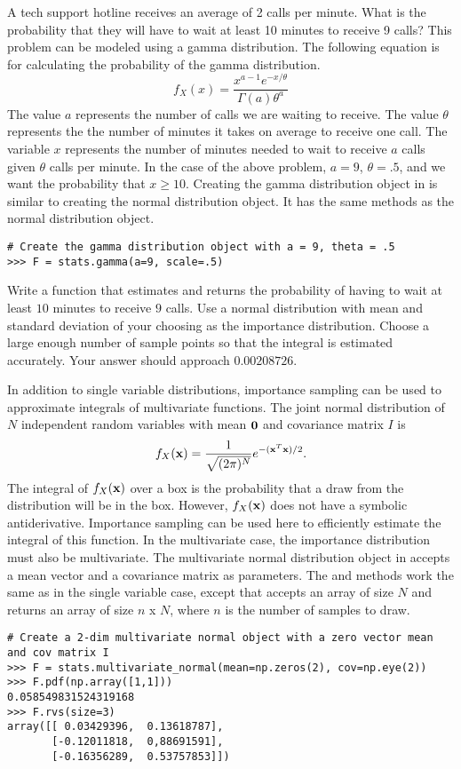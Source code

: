 \begin{problem} \label{prob:gamma}
A tech support hotline receives an average of 2 calls per minute.
What is the probability that they will have to wait at least 10 minutes to receive 9 calls?
This problem can be modeled using a gamma distribution.
The following equation is for calculating the probability of the gamma distribution.
$$f_X(x) = \frac{x^{a-1}e^{-x/\theta}}{\Gamma(a)\theta^a}$$
The value $a$ represents the number of calls we are waiting to receive.
The value $\theta$ represents the the number of minutes it takes on average to receive one call.
The variable $x$ represents the number of minutes needed to wait to receive $a$ calls given $\theta$ calls per minute.
In the case of the above problem, $a = 9$, $\theta = .5$, and we want the probability that $x \geq 10$.
Creating the gamma distribution object in  is similar to creating the normal distribution object.
It has the same methods as the normal distribution object.

\begin{lstlisting}
# Create the gamma distribution object with a = 9, theta = .5
>>> F = stats.gamma(a=9, scale=.5)
\end{lstlisting}

Write a function that estimates and returns the probability of having to wait at least $10$ minutes to receive $9$ calls.
Use a normal distribution with mean and standard deviation of your choosing as the importance distribution.
Choose a large enough number of sample points so that the integral is estimated accurately.
Your answer should approach $0.00208726$.
\end{problem}

In addition to single variable distributions, importance sampling can be used to approximate integrals of multivariate functions.
The joint normal distribution of $N$ independent random variables with mean $\mathbf{0}$ and covariance matrix $I$ is
\[
f_X(\mathbf{x}) = \frac{1}{\sqrt{(2 \pi)^N}} e^{-(\mathbf{x}^T\mathbf{x})/2}.
\]
The integral of $f_X(\mathbf{x})$ over a box is the probability that a draw from the distribution will be in the box.
However, $f_X(\mathbf{x})$ does not have a symbolic antiderivative.
Importance sampling can be used here to efficiently estimate the integral of this function.
In the multivariate case, the importance distribution must also be multivariate.
The multivariate normal distribution object in  accepts a mean vector and a covariance matrix as parameters.
The  and  methods work the same as in the single variable case, except that  accepts an array of size $N$ and  returns an array of size $n$ x $N$, where $n$ is the number of samples to draw.
\begin{lstlisting}
# Create a 2-dim multivariate normal object with a zero vector mean and cov matrix I
>>> F = stats.multivariate_normal(mean=np.zeros(2), cov=np.eye(2))
>>> F.pdf(np.array([1,1]))
0.058549831524319168
>>> F.rvs(size=3)
array([[ 0.03429396,  0.13618787],
       [-0.12011818,  0,88691591],
       [-0.16356289,  0.53757853]])
\end{lstlisting}

